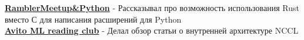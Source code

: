 \documentclass[a4paper]{article}
\begin{document}


{\textbf{\href{https://www.youtube.com/watch?v=gpf_KOAmgzY&t=3040s}{RamblerMeetup\&Python}}} - Рассказывал про возможность использования Rust вместо С для написания расширений для Python\\
{\textbf{\href{https://www.youtube.com/watch?v=m7wPkcx5P_A}{Avito ML reading club}}} - Делал обзор статьи о внутренней архитектуре NCCL \\
\vspace*{2mm}
\end{document}
